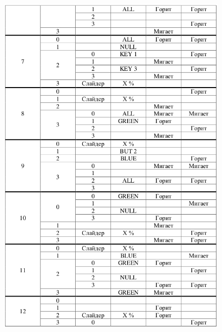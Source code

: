 \begin{figure}[H]
\begin{center}
\includegraphics[scale=0.7]{Image/92.jpg} 
\end{center}
\end{figure}

